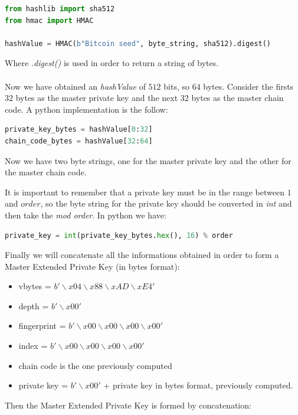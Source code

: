\begin{lstlisting}[language=Python]
from hashlib import sha512
from hmac import HMAC

hashValue = HMAC(b"Bitcoin seed", byte_string, sha512).digest()
\end{lstlisting}
Where \textit{.digest()} is used in order to return a string of bytes.
\\ \\
Now we have obtained an \textit{hashValue} of $512$ bits, so $64$ bytes. Consider the firsts $32$ bytes as the master private key and the next $32$ bytes as the master chain code. A python implementation is the follow:

\begin{lstlisting}[language=Python]
private_key_bytes = hashValue[0:32]
chain_code_bytes = hashValue[32:64]
\end{lstlisting}
\begin{flushleft}
	Now we have two byte strings, one for the master private key and the other for the master chain code.
\end{flushleft}
It is important to remember that a private key must be in the range between $1$ and $order$, so the byte string for the private key should be converted in \textit{int} and then take the \textit{mod order}. In python we have:

\begin{lstlisting}[language=Python]
private_key = int(private_key_bytes.hex(), 16) % order
\end{lstlisting}
\begin{flushleft}
	Finally we will concatenate all the informations obtained in order to form a Master Extended Private Key (in bytes format):
\end{flushleft}

\begin{itemize}
	\item vbytes = $b'\backslash x04\backslash x88\backslash xAD\backslash xE4'$
	\item depth = $b'\backslash x00'$
	\item fingerprint = $b'\backslash x00\backslash x00\backslash x00\backslash x00'$
	\item index = $b'\backslash x00\backslash x00\backslash x00\backslash x00'$
	\item chain code is the one previously computed
	\item private key = $b'\backslash x00'$ $+$ private key in bytes format, previously computed.
\end{itemize}
Then the Master Extended Private Key is formed by concatenation:


